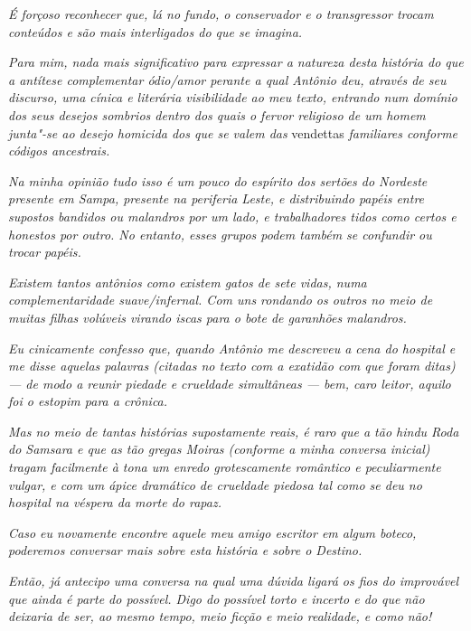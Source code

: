 \emph{É forçoso reconhecer que, lá no fundo, o conservador e o
transgressor trocam conteúdos e são mais interligados do que se
imagina.}

\emph{Para mim, nada mais significativo para expressar a natureza desta
história do que a antítese complementar ódio/amor perante a qual Antônio
deu, através de seu discurso, uma cínica e literária visibilidade ao meu
texto, entrando num domínio dos seus desejos sombrios dentro dos quais o
fervor religioso de um homem junta"-se ao desejo homicida dos que se
valem das} vendettas \emph{familiares conforme códigos ancestrais.}~

\emph{Na minha opinião tudo isso é um pouco do espírito dos sertões do
Nordeste presente em Sampa, presente na periferia Leste, e distribuindo
papéis entre supostos bandidos ou malandros por um lado, e trabalhadores
tidos como certos e honestos por outro. No entanto, esses grupos
podem também se confundir ou trocar papéis.}

\emph{Existem tantos antônios como existem gatos de sete vidas, numa
complementaridade suave/infernal. Com uns rondando os outros no meio de
muitas filhas volúveis virando iscas para o bote de garanhões
malandros.}~

\emph{Eu cinicamente confesso que, quando Antônio me descreveu a cena do
hospital e me disse aquelas palavras (citadas no texto com a exatidão
com que foram ditas) --- de modo a reunir piedade e crueldade
simultâneas --- bem, caro leitor, aquilo foi o estopim para a crônica.}~

\emph{Mas no meio de tantas histórias supostamente reais, é raro que a
tão hindu Roda do Samsara e que as tão gregas Moiras (conforme a minha
conversa inicial) tragam facilmente à tona um enredo grotescamente
romântico e peculiarmente vulgar, e com um ápice dramático de crueldade
piedosa tal como se deu no hospital na véspera da morte do rapaz.}~

\emph{Caso eu novamente encontre aquele meu amigo escritor em algum
boteco, poderemos conversar mais sobre esta história e sobre o Destino.}~

\emph{Então, já antecipo uma conversa na qual uma dúvida ligará os
fios do improvável que ainda é parte do possível. Digo do possível torto
e incerto e do que não deixaria de ser, ao mesmo tempo, meio ficção e meio
realidade, e como não!~}
\endgroup